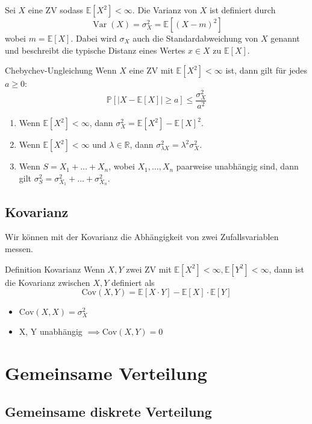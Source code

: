 \documentclass[a4paper,10pt]{article}
\def\R{\mathbb{R}}
\def\P{\mathbb{P}}
\def\E{\mathbb{E}}
\DeclareMathOperator{\Var}{\text{Var}}
\begin{document}
Sei \(X\) eine ZV sodass \(\E[X^2] < \infty\). Die Varianz von \(X\) ist definiert durch
\[\Var(X) = \sigma_X^2 = \E[(X-m)^2]\]
wobei \(m=\E[X]\). Dabei wird \(\sigma_X\) auch die Standardabweichung von \(X\) genannt und beschreibt die typische Distanz eines Wertes \(x\in X\) zu \(\E[X]\).

\begin{subbox}{Chebychev-Ungleichung}
	Wenn \(X\) eine ZV mit \(\E[X^2] < \infty\) ist, dann gilt für jedes \(a \ge 0\):
	\[\P[|X - \E[X]| \ge a] \le \frac{\sigma_X^2}{a^2}\]
\end{subbox}

\begin{enumerate}
	\item Wenn \(\E[X^2] < \infty\), dann \(\sigma_X^2 = \E[X^2] - \E[X]^2\).
	\item Wenn \(\E[X^2] < \infty\) und \(\lambda \in \R\), dann \(\sigma_{\lambda X}^2 = \lambda^2\sigma_X^2\).
	\item Wenn \(S = X_1 + \ldots + X_n\), wobei \(X_1, \ldots, X_n\) paarweise unabhängig sind, dann gilt \(\sigma_S^2 = \sigma_{X_1}^2 + \ldots + \sigma_{X_n}^2\).
\end{enumerate}


\subsection{Kovarianz}

Wir können mit der Kovarianz die Abhängigkeit von zwei Zufallsvariablen messen.
\begin{subbox}{Definition Kovarianz}
	Wenn \(X, Y\) zwei ZV mit \(\E[X^2] < \infty, \E[Y^2] < \infty\), dann ist die Kovarianz zwischen \(X, Y\) definiert als
	\[\text{Cov}(X,Y) = \E[X \cdot Y] - \E[X] \cdot \E[Y]\]
\end{subbox}
\begin{itemize}
	\item \(\text{Cov}(X,X) = \sigma_X^2\)
	\item X, Y unabhängig \(\implies \text{Cov}(X,Y) = 0\)
\end{itemize}


\section{Gemeinsame Verteilung}

\subsection{Gemeinsame diskrete Verteilung}
\end{document}
